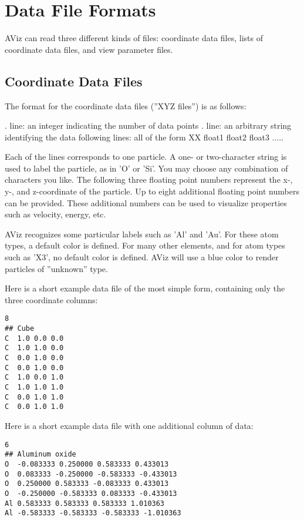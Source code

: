 \documentclass[11pt]{article}
\begin{document}
\section{Data File Formats}

AViz can read three different kinds of files: coordinate data files, 
lists of coordinate data files, and view parameter files.

\subsection{Coordinate Data Files}
The format for the coordinate data files (''XYZ files'') is as follows: 

. line: an integer indicating the number of data points \newline
{}. line: an arbitrary string identifying the data  \newline
\indent
  following lines: all of the form XX float1 float2 float3 ..... 

Each of the lines corresponds to one particle. A one- or two-character string 
is used to label the particle, as in 'O' or 'Si'.  You may choose any 
combination of characters you like.  The following three 
floating point numbers represent the x-, y-, and z-coordinate of the particle. 
Up to eight additional floating point numbers can be provided. These 
additional numbers can be used to visualize properties such as velocity, 
energy, etc. 

AViz recognizes some particular labels such as 'Al' and 'Au'.  For these 
atom types, a default color is defined.  For many other elements, and 
for atom types such as 'X3', no default color is defined.  AViz will 
use a blue color to render particles of ''unknown'' type.

Here is a short example data file of the most simple form, containing 
only the three coordinate columns:
\begin{verbatim}
8
## Cube
C  1.0 0.0 0.0
C  1.0 1.0 0.0
C  0.0 1.0 0.0
C  0.0 1.0 0.0
C  1.0 0.0 1.0
C  1.0 1.0 1.0
C  0.0 1.0 1.0
C  0.0 1.0 1.0
\end{verbatim}

Here is a short example data file with one additional column of data: 
\begin{verbatim}
6
## Aluminum oxide
O  -0.083333 0.250000 0.583333 0.433013
O  0.083333 -0.250000 -0.583333 -0.433013
O  0.250000 0.583333 -0.083333 0.433013
O  -0.250000 -0.583333 0.083333 -0.433013
Al 0.583333 0.583333 0.583333 1.010363
Al -0.583333 -0.583333 -0.583333 -1.010363
\end{verbatim}
\end{document}
